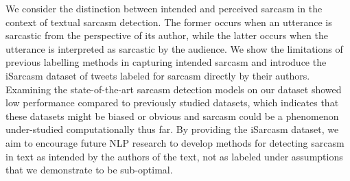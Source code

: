 We consider the distinction between intended and perceived sarcasm in the context of textual sarcasm detection. The former occurs when an utterance is sarcastic from the perspective of its author, while the latter occurs when the utterance is interpreted as sarcastic by the audience. We show the limitations of previous labelling methods in capturing intended sarcasm and introduce the iSarcasm dataset of tweets labeled for sarcasm directly by their authors. Examining the state-of-the-art sarcasm detection models on our dataset showed low performance compared to previously studied datasets, which indicates that these datasets might be biased or obvious and sarcasm could be a phenomenon under-studied computationally thus far. By providing the iSarcasm dataset, we aim to encourage future NLP research to develop methods for detecting sarcasm in text as intended by the authors of the text, not as labeled under assumptions that we demonstrate to be sub-optimal.
